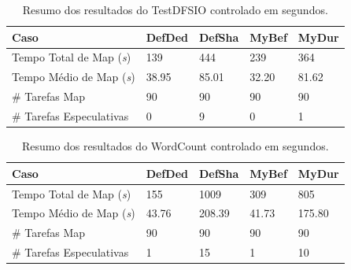 \begin{table}[h!]
	\caption{Resumo dos resultados do TestDFSIO controlado em segundos.} \label{tab:exp1IO}
	\begin{tabular*}{\hsize}{lllll} %
		\textbf{Caso} & \textbf{DefDed} & \textbf{DefSha} & \textbf{MyBef} & \textbf{MyDur}\\
		\hline
		Tempo Total de Map ({\it{s}}) & 139 & 444 & 239 & 364 \\
		Tempo Médio de Map ({\it{s}}) & 38.95 & 85.01 & 32.20 & 81.62 \\
		\# Tarefas Map & 90 & 90 & 90 & 90 \\
		\# Tarefas Especulativas & 0 & 9 & 0 & 1 \\
	\end{tabular*}
\end{table}


\begin{table}[h!]
	\caption{Resumo dos resultados do WordCount controlado em segundos.} \label{tab:exp1WC}
	\begin{tabular*}{\hsize}{lllll} %
		\textbf{Caso} & \textbf{DefDed} & \textbf{DefSha} & \textbf{MyBef} & \textbf{MyDur}\\
		\hline
		Tempo Total de Map ({\it{s}}) & 155 & 1009 & 309 & 805 \\
		Tempo Médio de Map ({\it{s}}) & 43.76 & 208.39 & 41.73 & 175.80 \\
		\# Tarefas Map & 90 & 90 & 90 & 90 \\
		\# Tarefas Especulativas & 1 & 15 & 1 & 10 \\
	\end{tabular*}
\end{table}

